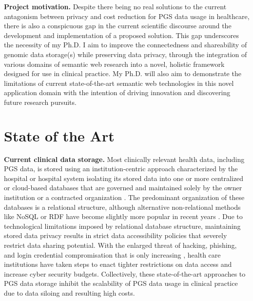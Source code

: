 \documentclass[runningheads]{llncs}
\begin{document}
\textbf{Project motivation.}
Despite there being no real solutions to the current antagonism between privacy and cost reduction for PGS data usage in healthcare, there is also a conspicuous gap in the current scientific discourse around the development and implementation of a proposed solution. 
This gap underscores the necessity of my Ph.D.
I aim to improve the connectedness and shareability of genomic data storage(s) while preserving data privacy, through the integration of various domains of semantic web research into a novel, holistic framework designed for use in clinical practice. 
My Ph.D. will also aim to demonstrate the limitations of current state-of-the-art semantic web technologies in this novel application domain with the intention of driving innovation and discovering future research pursuits.


\section{State of the Art}

\textbf{Current clinical data storage.}
Most clinically relevant health data, including PGS data, is stored using an institution-centric approach characterized by the hospital or hospital system isolating its stored data into one or more centralized or cloud-based databases that are governed and maintained solely by the owner institution or a contracted organization \cite{quantin_medical_2011}. 
The predominant organization of these databases is a relational structure, although alternative non-relational methods like NoSQL or RDF have become slightly more popular in recent years \cite{kotsilieris_efficient_2021}.
Due to technological limitations imposed by relational database structure, maintaining stored data privacy results in strict data accessibility policies that severely restrict data sharing potential.
With the enlarged threat of hacking, phishing, and login credential compromisation that is only increasing \cite{noauthor_ransomware_nodate}, health care institutions have taken steps to enact tighter restrictions on data access and increase cyber security budgets.  
Collectively, these state-of-the-art approaches to PGS data storage inhibit the scalability of PGS data usage in clinical practice due to data siloing and resulting high costs.
\end{document}
